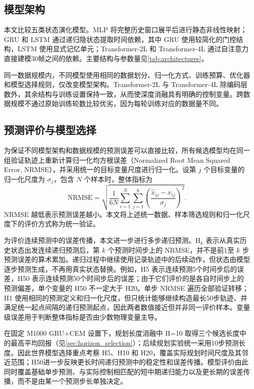 \subsection{模型架构}

本文比较五类状态演化模型。MLP 将完整历史窗口展平后进行静态非线性映射；GRU 和 LSTM 通过递归隐状态提取时间依赖，其中 GRU 使用较简化的门控结构，LSTM 使用显式记忆单元；Transformer-2L 和 Transformer-4L 通过自注意力直接建模30帧之间的依赖\cite{vaswani2017attention}。主要结构与参数量见\cref{tab:architectures}。



同一数据规模内，不同模型使用相同的数据划分、归一化方式、训练预算、优化器和模型选择规则，仅改变模型架构。Transformer-2L 与 Transformer-4L 除编码层数外，其余结构与训练设置保持一致，从而使深度消融具有明确的控制变量。跨数据规模不通过原始训练轮数比较优劣，因为每轮训练对应的数据量不同。

\subsection{预测评价与模型选择}

为保证不同模型架构和数据规模的预测误差可以直接比较，所有候选模型均在同一组验证轨迹上重新计算归一化均方根误差（Normalized Root Mean Squared Error, NRMSE），并采用统一的目标变量尺度进行归一化。设第 $j$ 个目标变量的归一化尺度为 $\sigma_j$，包含 $N$ 个样本时，整体指标为
\begin{equation}
  \mathrm{NRMSE}=\sqrt{\frac{1}{6N}\sum_{i=1}^{N}\sum_{j=1}^{6}
  \left(\frac{\hat{x}_{ij}-x_{ij}}{\sigma_j}\right)^2}.
\end{equation}
NRMSE 越低表示预测误差越小。本文将上述统一数据、样本筛选规则和归一化尺度下的评价方式称为统一验证。

为评价连续预测中的误差传播，本文进一步进行多步递归预测。$\mathrm{H}_k$ 表示从真实历史状态出发连续递归预测后，第 $k$ 个预测时间步上的 NRMSE，并不是前1至 $k$ 步预测误差的算术累加。递归过程中继续使用记录轨迹中的后续动作，但状态由模型逐步预测生成，不再用真实状态替换。例如，H5 表示连续预测5个时间步后的误差，H50 表示连续预测50个时间步后的误差；由于它们评价的是各自时间步上的预测偏差，单个变量的 H50 不一定大于 H20。单步 NRMSE 遍历全部验证转移；H1 使用相同的预测定义和归一化尺度，但只统计能够继续构造最长50步轨迹、并满足统一起点间隔的递归预测起点，因此两者数值接近但并非同一评价样本。变量级误差用于判断整体指标是否由少数物理变量主导。

在固定 M1000 GRU+CEM 设置下，规划长度消融中 H=10 取得三个候选长度中的最高平均回报（见\cref{sec:horizon_selection}）；后续规划实验统一采用10步预测长度。因此世界模型选择重点考察 H5、H10 和 H20，覆盖实际规划时间尺度及其邻近范围；H50进一步反映更长时间递归预测中的稳定性和误差传播。模型评价由此同时覆盖基础单步预测、与实际控制相匹配的短中期递归能力以及更长期的误差传播，而不是由某一个预测步长单独决定。

